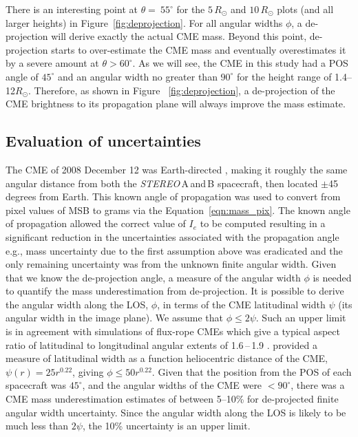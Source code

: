 There is an interesting point at $\theta=~55^{\circ}$ for the $5\,R_{\odot}$ and $10\,R_{\odot}$ plots (and all larger heights) in Figure~\ref{fig:deprojection}. For all angular widths $\phi$, a de-projection will derive exactly the actual CME mass. Beyond this point, de-projection starts to over-estimate the CME mass and eventually overestimates it by a severe amount at  $\theta>60^{\circ}$. As we will see, the CME in this study had a POS angle of $45^{\circ}$ and an angular width no greater than $90^{\circ}$ for the height range of 1.4--12$R_{\odot}$. Therefore, as shown in Figure ~\ref{fig:deprojection}, a de-projection of the CME brightness to its propagation plane will always improve the mass estimate.





\subsection{Evaluation of uncertainties}
The CME of 2008 December 12 was Earth-directed \citep{byrne2010}, making it roughly the same angular distance from both the \emph{STEREO}\,A\,and\,B spacecraft, then located $\pm$45 degrees from Earth. This known angle of propagation was used to convert from pixel values of MSB to grams via the Equation~\ref{eqn:mass_pix}.
The known angle of propagation allowed the correct value of $I_{e}$ to be computed resulting in a significant reduction in the uncertainties associated with the propagation angle e.g., mass uncertainty due to the first assumption above was eradicated and the only remaining uncertainty was from the unknown finite angular width. Given that we know the de-projection angle, a measure of the angular width $\phi$ is needed to quantify the mass underestimation from de-projection. It is possible to derive the angular width along the LOS, $\phi$, in terms of the CME latitudinal width $\psi$ (its angular width in the image plane). We assume that $\phi \leqslant 2\psi$.  Such an upper limit is in agreement with simulations of flux-rope CMEs which give a typical aspect ratio of latitudinal to longitudinal angular extents of 1.6\,--\,1.9 \citep{krall2006}. \citet{byrne2010} provided a measure of latitudinal width as a function heliocentric distance of the CME, $\psi(r)=25r^{0.22}$, giving $\phi \leqslant 50r^{0.22}$. Given that the position from the POS of each spacecraft was $45^{\circ}$, and the angular widths of the CME were $<90^{\circ}$, there was a CME mass underestimation estimates of between 5--10\% for de-projected finite angular width uncertainty. Since the angular width along the LOS is likely to be much less than $2\psi$, the 10\% uncertainty is an upper limit.


